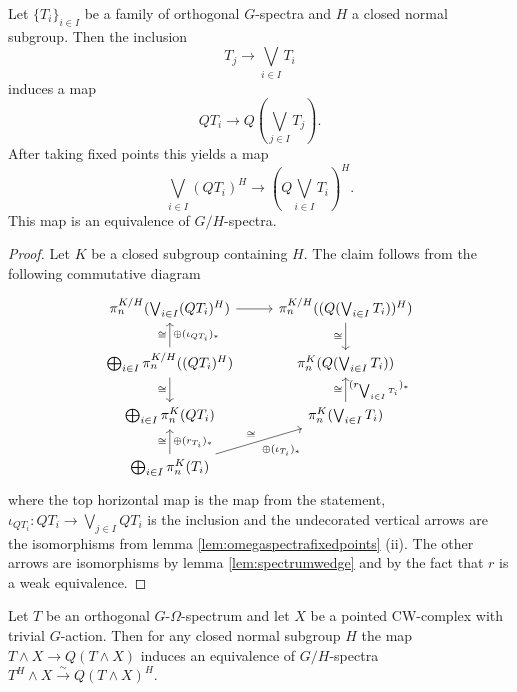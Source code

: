 \begin{lem}\label{lem:wedgefixed}
Let $\{T_i\}_{i\in I}$ be a family of  orthogonal $G$-spectra and $H$ a closed normal subgroup. Then the inclusion
$$T_j\rightarrow \bigvee_{i\in I } T_i$$ induces a map
$$QT_i\rightarrow Q\left(\bigvee_{j \in I } T_j\right).$$ After taking fixed points
this yields a map 
$$\bigvee_{i\in I}(QT_i)^H\rightarrow \left(Q\bigvee_{i \in I } T_i\right)^H.$$
This map is an equivalence of $G/H$-spectra.
\end{lem}

\begin{proof}
Let $K$ be a closed subgroup containing $H$. The claim follows from the
following commutative diagram
$$
\begin{tikzcd}
\pi_n^{K/H}(\bigvee_{i\in I}(QT_i)^H) \arrow{r} 
&\pi_n^{K/H}((Q(\bigvee_{i \in I } T_i))^H) \arrow{d}[swap]{\cong} \\
\bigoplus_{i\in I} \pi_n^{K/H}((QT_i)^H) 
\arrow{u}{\cong}[swap]{\oplus (\iota_{QT_i})_\ast} 
\arrow{d}[swap]{\cong}
&\pi_n^K(Q(\bigvee_{i \in I } T_i))\\
\bigoplus_{i\in I} \pi_n^{K}(QT_i)
& \pi_n^K(\bigvee_{i \in I } T_i) \arrow{u}{\cong}[swap]{(r_{\bigvee_{i \in I } T_i})_\ast}\\
\bigoplus_{i\in I} \pi_n^{K}(T_i) \arrow{u}{\cong}[swap]{\oplus (r_{T_i})_\ast}  
\arrow{ru}{\cong}[swap]{\oplus (\iota_{T_i})_\ast} 
\end{tikzcd}
$$
where the top horizontal map is the map from the statement, $\iota_{QT_i}:QT_i
\rightarrow \bigvee_{j\in I} QT_i$ is the inclusion and the undecorated vertical arrows 
are the isomorphisms from lemma \ref{lem:omegaspectrafixedpoints} (ii). The other arrows
are isomorphisms by lemma \ref{lem:spectrumwedge} and by the fact
that $r$ is a weak equivalence.
\end{proof}

\begin{lem}\label{lem:smashfixednonequivariant}
Let $T$ be an orthogonal $G$-$\Omega$-spectrum and let $X$ be a pointed CW-complex with trivial $G$-action.
Then for any closed normal subgroup $H$ the map 
$ T\wedge X\to Q(T\wedge X)
$
induces an equivalence of $G/H$-spectra $T^H\wedge X\xrightarrow{\sim}Q(T\wedge X)^H$.
\end{lem}

